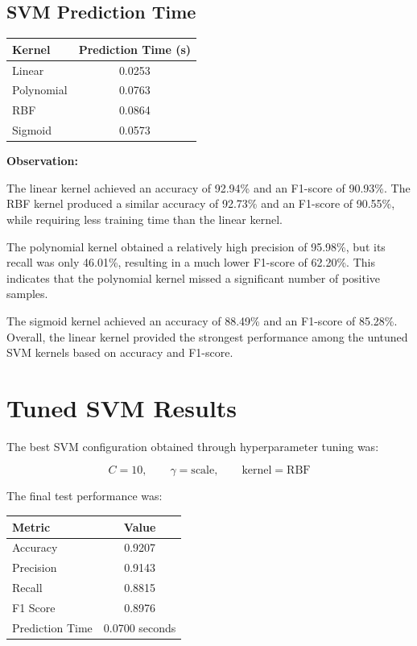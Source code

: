 \documentclass[12pt,a4paper]{article}
\begin{document}
\subsection{SVM Prediction Time}

\begin{longtable}{|p{4cm}|c|}
\hline
\textbf{Kernel} & \textbf{Prediction Time (s)} \\ \hline

Linear & 0.0253 \\ \hline

Polynomial & 0.0763 \\ \hline

RBF & 0.0864 \\ \hline

Sigmoid & 0.0573 \\ \hline

\end{longtable}

\textbf{Observation:}

The linear kernel achieved an accuracy of 92.94\% and an F1-score of
90.93\%. The RBF kernel produced a similar accuracy of 92.73\% and
an F1-score of 90.55\%, while requiring less training time than the
linear kernel.

The polynomial kernel obtained a relatively high precision of 95.98\%,
but its recall was only 46.01\%, resulting in a much lower F1-score of
62.20\%. This indicates that the polynomial kernel missed a significant
number of positive samples.

The sigmoid kernel achieved an accuracy of 88.49\% and an F1-score of
85.28\%. Overall, the linear kernel provided the strongest performance
among the untuned SVM kernels based on accuracy and F1-score.


\section{Tuned SVM Results}

The best SVM configuration obtained through hyperparameter tuning was:

\[
C=10,\qquad
\gamma=\text{scale},\qquad
\text{kernel}=\text{RBF}
\]

The final test performance was:

\begin{longtable}{|p{7cm}|c|}
\hline
\textbf{Metric} & \textbf{Value} \\ \hline

Accuracy & 0.9207 \\ \hline

Precision & 0.9143 \\ \hline

Recall & 0.8815 \\ \hline

F1 Score & 0.8976 \\ \hline

Prediction Time & 0.0700 seconds \\ \hline

\end{longtable}
\end{document}
